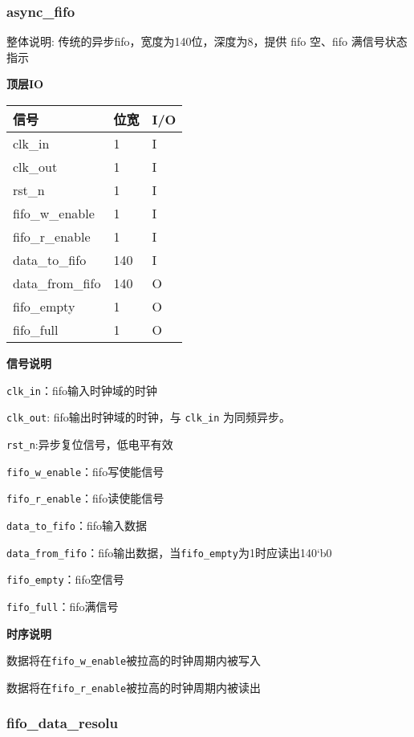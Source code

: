 \documentclass[12pt,]{article}
\begin{document}
\hypertarget{async_fifo}{%
\subsubsection{async\_fifo}\label{async_fifo}}

整体说明: 传统的异步fifo，宽度为140位，深度为8，提供 fifo 空、fifo
满信号状态指示

\textbf{顶层IO}

\begin{longtable}[]{@{}lll@{}}
\toprule\noalign{}
信号 & 位宽 & I/O \\
\midrule\noalign{}
\endhead
\bottomrule\noalign{}
\endlastfoot
clk\_in & 1 & I \\
clk\_out & 1 & I \\
rst\_n & 1 & I \\
fifo\_w\_enable & 1 & I \\
fifo\_r\_enable & 1 & I \\
data\_to\_fifo & 140 & I \\
data\_from\_fifo & 140 & O \\
fifo\_empty & 1 & O \\
fifo\_full & 1 & O \\
\end{longtable}

\textbf{信号说明}

\texttt{clk\_in}：fifo输入时钟域的时钟

\texttt{clk\_out}: fifo输出时钟域的时钟，与 \texttt{clk\_in}
为同频异步。

\texttt{rst\_n}:异步复位信号，低电平有效

\texttt{fifo\_w\_enable}：fifo写使能信号

\texttt{fifo\_r\_enable}：fifo读使能信号

\texttt{data\_to\_fifo}：fifo输入数据

\texttt{data\_from\_fifo}：fifo输出数据，当\texttt{fifo\_empty}为1时应读出140`b0

\texttt{fifo\_empty}：fifo空信号

\texttt{fifo\_full}：fifo满信号

\textbf{时序说明}

数据将在\texttt{fifo\_w\_enable}被拉高的时钟周期内被写入

数据将在\texttt{fifo\_r\_enable}被拉高的时钟周期内被读出

\hypertarget{fifo_data_resolu}{%
\subsubsection{fifo\_data\_resolu}\label{fifo_data_resolu}}
\end{document}

